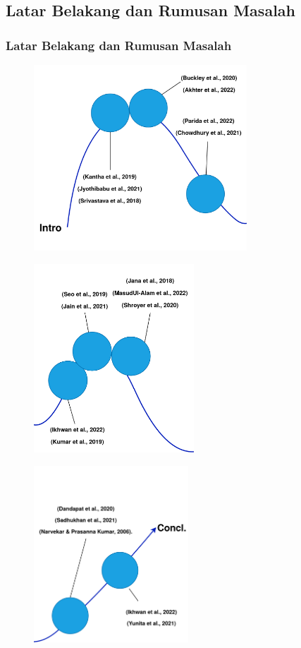 \documentclass{beamer}
\begin{document}
\subsection{Latar Belakang dan Rumusan Masalah}
\begin{frame}[allowframebreaks]
\frametitle{Latar Belakang dan Rumusan Masalah}
	\begin{figure}[H]
		\centering
		\includegraphics[width=8cm]{intro-1}
	\end{figure}
	\begin{figure}[H]
		\centering
		\includegraphics[width=6cm]{intro-2}
	\end{figure}
	\begin{figure}[H]
		\centering
		\includegraphics[width=5.8cm]{intro-3}
	\end{figure}
\end{frame}
\end{document}
